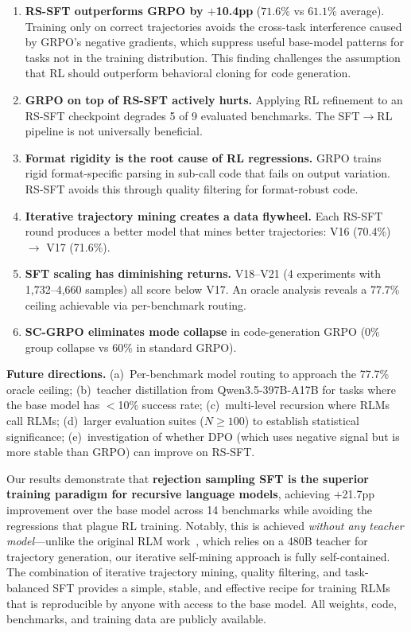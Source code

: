 \documentclass{article}
\begin{document}
\begin{enumerate}
    \item \textbf{RS-SFT outperforms GRPO by $+$10.4pp} ($71.6\%$ vs $61.1\%$ average). Training only on correct trajectories avoids the cross-task interference caused by GRPO's negative gradients, which suppress useful base-model patterns for tasks not in the training distribution. This finding challenges the assumption that RL should outperform behavioral cloning for code generation.

    \item \textbf{GRPO on top of RS-SFT actively hurts.} Applying RL refinement to an RS-SFT checkpoint degrades 5 of 9 evaluated benchmarks. The SFT$\to$RL pipeline is not universally beneficial.

    \item \textbf{Format rigidity is the root cause of RL regressions.} GRPO trains rigid format-specific parsing in sub-call code that fails on output variation. RS-SFT avoids this through quality filtering for format-robust code.

    \item \textbf{Iterative trajectory mining creates a data flywheel.} Each RS-SFT round produces a better model that mines better trajectories: V16 (70.4\%) $\to$ V17 (71.6\%).

    \item \textbf{SFT scaling has diminishing returns.} V18--V21 (4 experiments with 1,732--4,660 samples) all score below V17. An oracle analysis reveals a 77.7\% ceiling achievable via per-benchmark routing.

    \item \textbf{SC-GRPO eliminates mode collapse} in code-generation GRPO (0\% group collapse vs 60\% in standard GRPO).
\end{enumerate}

\textbf{Future directions.} (a)~Per-benchmark model routing to approach the 77.7\% oracle ceiling; (b)~teacher distillation from Qwen3.5-397B-A17B for tasks where the base model has $<$10\% success rate; (c)~multi-level recursion where RLMs call RLMs; (d)~larger evaluation suites ($N{\geq}100$) to establish statistical significance; (e)~investigation of whether DPO (which uses negative signal but is more stable than GRPO) can improve on RS-SFT.

Our results demonstrate that \textbf{rejection sampling SFT is the superior training paradigm for recursive language models}, achieving $+$21.7pp improvement over the base model across 14 benchmarks while avoiding the regressions that plague RL training. Notably, this is achieved \emph{without any teacher model}---unlike the original RLM work~\cite{zhang2026rlm}, which relies on a 480B teacher for trajectory generation, our iterative self-mining approach is fully self-contained. The combination of iterative trajectory mining, quality filtering, and task-balanced SFT provides a simple, stable, and effective recipe for training RLMs that is reproducible by anyone with access to the base model. All weights, code, benchmarks, and training data are publicly available.
\end{document}
